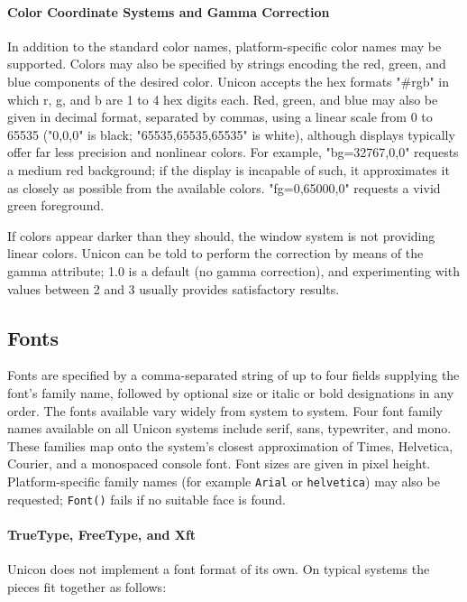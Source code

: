 \paragraph{Color Coordinate Systems and Gamma Correction}
In addition to the standard color names, platform-specific color names
may be supported. Colors may also be specified by strings encoding the
red, green, and blue components of the desired color. Unicon accepts
the hex formats "\#rgb" in which r, g, and b are 1 to 4 hex digits
each. Red, green, and blue may also be given in decimal format,
separated by commas, using a linear scale from 0
to 65535 ("0,0,0" is black; "65535,65535,65535" is white), although
displays typically offer far less precision and
nonlinear colors. For example, "bg=32767,0,0" requests a medium red
background; if the display is incapable of such, it approximates it as
closely as possible from the available colors.  "fg=0,65000,0"
requests a vivid green foreground.

If colors appear darker than they
should, the window system is not providing linear colors. Unicon can
be told to perform the correction by means of the gamma attribute; 1.0
is a default (no gamma correction), and experimenting with values
between 2 and 3 usually provides satisfactory results.

\subsection*{Fonts}

Fonts are specified by a comma-separated string of up to four fields
supplying the font's family name, followed by optional size or italic
or bold designations in any order. The fonts available vary widely
from system to system. Four font family names available on all Unicon
systems include serif, sans, typewriter, and mono. These families map
onto the system's closest approximation of Times, Helvetica, Courier,
and a monospaced console font. Font sizes are given in pixel height.
Platform-specific family names (for example \texttt{Arial} or
\texttt{helvetica}) may also be requested; \texttt{Font()} fails if
no suitable face is found.

\paragraph{TrueType, FreeType, and Xft}

Unicon does not implement a font format of its own. On typical systems
the pieces fit together as follows:

